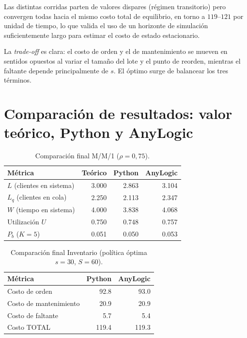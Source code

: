 \documentclass{article}
\begin{document}
Las distintas corridas parten de valores dispares (régimen transitorio)
pero convergen todas hacia el mismo costo total de equilibrio, en torno a
$119$--$121$ por unidad de tiempo, lo que valida el uso de un horizonte de
simulación suficientemente largo para estimar el costo de estado
estacionario.

La \textit{trade-off} es clara: el costo de orden y el de mantenimiento se
mueven en sentidos opuestos al variar el tamaño del lote y el punto de
reorden, mientras el faltante depende principalmente de $s$. El óptimo
surge de balancear los tres términos.

\section{Comparación de resultados: valor teórico, Python y AnyLogic}

\begin{table}[H]
\centering
\caption{Comparación final M/M/1 ($\rho=0{,}75$).}
\label{tab:comparacion_final}
\begin{tabular}{lrrr}
\toprule
Métrica & Teórico & Python & AnyLogic \\
\midrule
$L$ (clientes en sistema) & 3.000 & 2.863 & 3.104 \\
$L_q$ (clientes en cola)  & 2.250 & 2.113 & 2.347 \\
$W$ (tiempo en sistema)   & 4.000 & 3.838 & 4.068 \\
Utilización $U$           & 0.750 & 0.748 & 0.757 \\
$P_b$ ($K=5$)             & 0.051 & 0.050 & 0.053 \\
\bottomrule
\end{tabular}
\end{table}

\begin{table}[H]
\centering
\caption{Comparación final Inventario (política óptima $s=30$, $S=60$).}
\label{tab:comparacion_inv}
\begin{tabular}{lrr}
\toprule
Métrica & Python & AnyLogic \\
\midrule
Costo de orden       & 92.8  & 93.0 \\
Costo de mantenimiento & 20.9 & 20.9 \\
Costo de faltante    & 5.7  & 5.4 \\
Costo TOTAL          & 119.4 & 119.3 \\
\bottomrule
\end{tabular}
\end{table}
\end{document}
